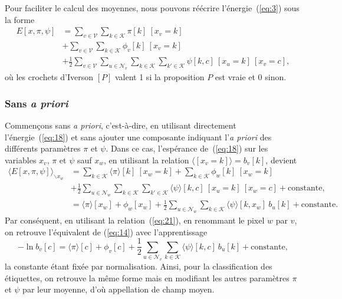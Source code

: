 \documentclass[a4paper,11pt,oneside]{article}
\let\<\langle
\let\>\rangle
\begin{document}
Pour faciliter le calcul des moyennes, nous pouvons réécrire
l'énergie~(\ref{eq:3}) sous la forme
\begin{equation}
  \label{eq:18}
  \begin{split}
    E[x,\pi,\psi]
    &= \sum_{v\in\mathcal V} \sum_{k\in\mathcal K}
       \pi[k]\:[x_v=k]\\
    &+ \sum_{v\in\mathcal V} \sum_{k\in\mathcal K}
       \phi_v[k]\:[x_v = k]\\
    &+ \frac12\sum_{v\in\mathcal V}\sum_{u\in\mathcal N_v}
       \sum_{k\in\mathcal K}\sum_{k'\in\mathcal K}
       \psi[k, c]\:[x_u=k]\:[x_v=c],
  \end{split}
\end{equation}
où les crochets d'Iverson $[P]$ valent 1 si la proposition
$P$ est vraie et 0 sinon.



\subsubsection{Sans \emph{a priori}}
\label{sec:sans-a-priori}

Commençons sans \emph{a priori}, c'est-à-dire, en utilisant
directement l'énergie~(\ref{eq:18}) et sans ajouter une
composante indiquant l'\emph{a priori} des différents
paramètres $\pi$ et $\psi$. Dans ce cas, l'espérance
de~(\ref{eq:18}) sur les variables $x_v$, $\pi$ et $\psi$
sauf $x_w$, en utilisant la relation $\bigl\<[x_v=k]\bigr\>
= b_v[k]$, devient
\begin{align}
  \label{eq:22}
  \bigr\<E[x,\pi,\psi]\bigr\>_{\backslash x_w}
   &= \sum_{k\in\mathcal K} \<\pi\>[k]\:[x_w = k]
    + \sum_{k\in\mathcal K} \phi_w[k]\:[x_w = k]\nonumber\\
   &+ \frac12\sum_{u\in\mathcal N_w}
       \sum_{k\in\mathcal K}\sum_{k'\in\mathcal K}
       \<\psi\>[k, c]\:[x_u=k]\:[x_w=c] +\text{constante},\\
  \label{eq:220}
   &= \<\pi\>[x_w]
     + \phi_w[x_w]
     + \frac12\sum_{u\in\mathcal N_w}
       \sum_{k\in\mathcal K}
       \<\psi\>[k, x_w]\:b_u[k] +\text{constante}.
\end{align}
Par conséquent, en utilisant la relation~(\ref{eq:21}), en
renommant le pixel $w$ par $v$, on retrouve l'équivalent de
(\ref{eq:14}) avec l'apprentissage
\begin{equation}
  \label{eq:23}
  -\ln b_v[c] = \<\pi\>[c] + \phi_v[c]
  + \frac12\sum_{u\in\mathcal N_v}
  \sum_{k\in\mathcal K} \<\psi\>[k, c]\:b_u[k] +\text{constante},
\end{equation}
la constante étant fixée par normalisation. Ainsi, pour la
classification des étiquettes, on retrouve la même forme
mais en modifiant les autres paramètres $\pi$ et $\psi$ par
leur moyenne, d'où appellation de champ moyen.
\end{document}
